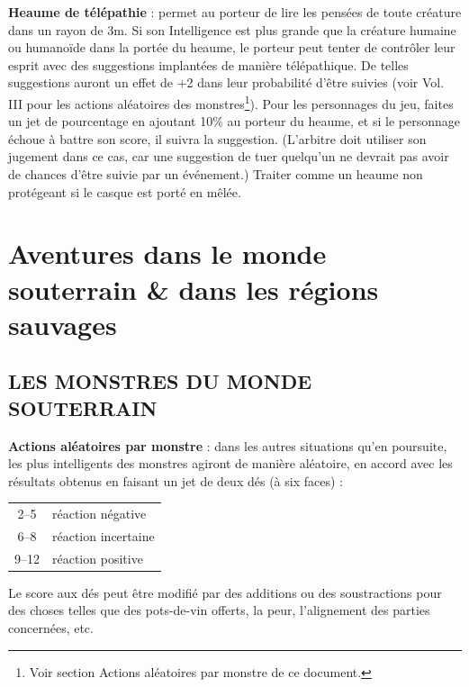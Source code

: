 \documentclass[11pt]{article}
\begin{document}
{{\textbf{Heaume de télépathie} : permet au porteur de lire les pensées de toute créature dans un rayon de 3m. Si son Intelligence est plus grande que la créature humaine ou humanoïde dans la portée du heaume, le porteur peut tenter de contrôler leur esprit avec des suggestions implantées de manière télépathique. De telles suggestions auront un effet de +2 dans leur probabilité d'être suivies (voir Vol. III pour les actions aléatoires des monstres\footnote{Voir section \og Actions aléatoires par monstre \fg{} de ce document.}). Pour les personnages du jeu, faites un jet de pourcentage en ajoutant 10\% au porteur du heaume, et si le personnage échoue à battre son score,%
il suivra la suggestion. (L'arbitre doit utiliser son jugement dans ce cas, car une suggestion de tuer quelqu'un ne devrait pas avoir de chances d'être suivie par un événement.) Traiter comme un heaume non protégeant si le casque est porté en mêlée.

}%

\newpage
\section*{Aventures dans le monde souterrain \& dans les régions sauvages}

\subsection*{LES MONSTRES DU MONDE SOUTERRAIN}

\textbf{Actions aléatoires par monstre} : dans les autres situations qu'en poursuite, les plus intelligents des monstres agiront de manière aléatoire, en accord avec les résultats obtenus en faisant un jet de deux dés (à six faces) :

\bigskip

{\parindent6cm \begin{tabular}{cl}
2--5 & réaction négative \\
6--8 & réaction incertaine \\
9--12 & réaction positive \\
\end{tabular}}

\medskip

Le score aux dés peut être modifié par des additions ou des soustractions pour des choses telles que des pots-de-vin offerts, la peur, l'alignement des parties concernées, etc.

}
\end{document}

